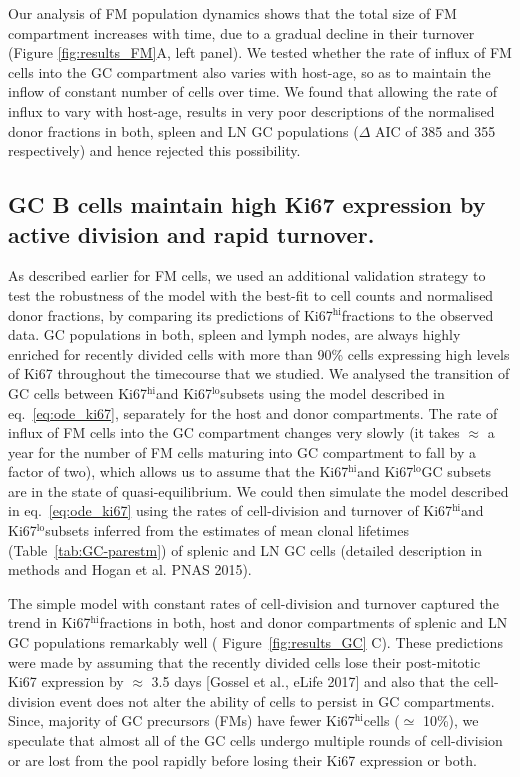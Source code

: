 \documentclass[11pt]{article}
\newcommand{\red}[1]{{\color{red}{#1}}}
\newcommand{\khi}{Ki67$^\text{hi}$}
\newcommand{\klo}{Ki67$^\text{lo}$}
\begin{document}
	Our analysis of FM population dynamics shows that the total size of FM compartment increases with time, due to a gradual decline in their turnover (Figure \ref{fig:results_FM}A, left panel).
	We tested whether the rate of influx of FM cells into the GC compartment also varies with host-age, so as to maintain the inflow of constant number of cells over time. 
	We found that allowing the rate of influx to vary with host-age, results in very poor descriptions of the normalised donor fractions in both, spleen and LN GC populations ($\Delta$ AIC of 385 and 355 respectively) and hence rejected this possibility.
	\red{Therefore, follicular cells maturing into the GC compartment at any given time are proportional to the size of the FM population at that moment.}
		
	
	\subsection*{GC B cells maintain high Ki67 expression by active division and rapid turnover.}
	As described earlier for FM cells, we used an additional validation strategy to test the robustness of the model with the best-fit to cell counts and normalised donor fractions, by comparing its predictions of \khi fractions to the observed data.
	GC populations in both, spleen and lymph nodes, are always highly enriched for recently divided cells with more than 90\% cells expressing high levels of Ki67 throughout the timecourse that we studied.
	We analysed the transition of GC cells between \khi and \klo subsets using the model described in eq.~\ref{eq:ode_ki67}, separately for the host and donor compartments. 
	The rate of influx of FM cells into the GC compartment changes very slowly (it takes $\approx$ a year for the number of FM cells maturing into GC compartment to fall by a factor of two), which allows us to assume that the \khi and \klo GC subsets are in the state of quasi-equilibrium.
	We could then simulate the model described in eq.~\ref{eq:ode_ki67} using the rates of cell-division and turnover of \khi and \klo subsets inferred from the estimates of mean clonal lifetimes (Table~\ref{tab:GC-parestm}) of splenic and LN GC cells (detailed description in methods and Hogan et al. PNAS 2015).
	
	The simple model with constant rates of cell-division and turnover captured the trend in \khi fractions in both, host and donor compartments of splenic and LN GC populations remarkably well ( Figure~\ref{fig:results_GC} C).
	These predictions were made by assuming that the recently divided cells lose their post-mitotic Ki67 expression by $\approx$ 3.5 days [Gossel et al., eLife 2017] and also that the cell-division event does not alter the ability of cells to persist in GC compartments. 
	Since, majority of GC precursors (FMs) have fewer \khi cells ($\simeq$ 10\%), we speculate that almost all of the GC cells undergo multiple rounds of cell-division or are lost from the pool rapidly before losing their Ki67 expression or both. 
	
\end{document}

